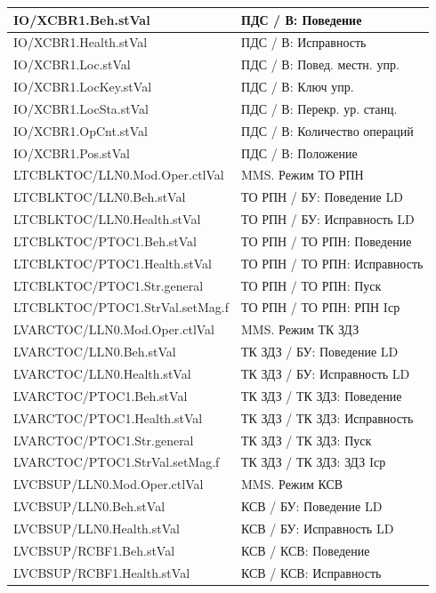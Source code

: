 \begin{longtable}{|>{\raggedright\arraybackslash}m{}|>{\raggedright\arraybackslash}m{}|}
IO/XCBR1.Beh.stVal & ПДС / В: Поведение \\
\hline
IO/XCBR1.Health.stVal & ПДС / В: Исправность \\
\hline
IO/XCBR1.Loc.stVal & ПДС / В: Повед. местн. упр. \\
\hline
IO/XCBR1.LocKey.stVal & ПДС / В: Ключ упр. \\
\hline
IO/XCBR1.LocSta.stVal & ПДС / В: Перекр. ур. станц. \\
\hline
IO/XCBR1.OpCnt.stVal & ПДС / В: Количество операций \\
\hline
IO/XCBR1.Pos.stVal & ПДС / В: Положение \\
\hline
LTCBLKTOC/LLN0.Mod.Oper.ctlVal & MMS. Режим ТО РПН \\
\hline
LTCBLKTOC/LLN0.Beh.stVal & ТО РПН / БУ: Поведение LD \\
\hline
LTCBLKTOC/LLN0.Health.stVal & ТО РПН / БУ: Исправность LD \\
\hline
LTCBLKTOC/PTOC1.Beh.stVal & ТО РПН / ТО РПН: Поведение \\
\hline
LTCBLKTOC/PTOC1.Health.stVal & ТО РПН / ТО РПН: Исправность \\
\hline
LTCBLKTOC/PTOC1.Str.general & ТО РПН / ТО РПН: Пуск \\
\hline
LTCBLKTOC/PTOC1.StrVal.setMag.f & ТО РПН / ТО РПН: РПН Iср \\
\hline
LVARCTOC/LLN0.Mod.Oper.ctlVal & MMS. Режим ТК ЗДЗ \\
\hline
LVARCTOC/LLN0.Beh.stVal & ТК ЗДЗ / БУ: Поведение LD \\
\hline
LVARCTOC/LLN0.Health.stVal & ТК ЗДЗ / БУ: Исправность LD \\
\hline
LVARCTOC/PTOC1.Beh.stVal & ТК ЗДЗ / ТК ЗДЗ: Поведение \\
\hline
LVARCTOC/PTOC1.Health.stVal & ТК ЗДЗ / ТК ЗДЗ: Исправность \\
\hline
LVARCTOC/PTOC1.Str.general & ТК ЗДЗ / ТК ЗДЗ: Пуск \\
\hline
LVARCTOC/PTOC1.StrVal.setMag.f & ТК ЗДЗ / ТК ЗДЗ: ЗДЗ Iср \\
\hline
LVCBSUP/LLN0.Mod.Oper.ctlVal & MMS. Режим КСВ \\
\hline
LVCBSUP/LLN0.Beh.stVal & КСВ / БУ: Поведение LD \\
\hline
LVCBSUP/LLN0.Health.stVal & КСВ / БУ: Исправность LD \\
\hline
LVCBSUP/RCBF1.Beh.stVal & КСВ / КСВ: Поведение \\
\hline
LVCBSUP/RCBF1.Health.stVal & КСВ / КСВ: Исправность \\

\end{longtable}
